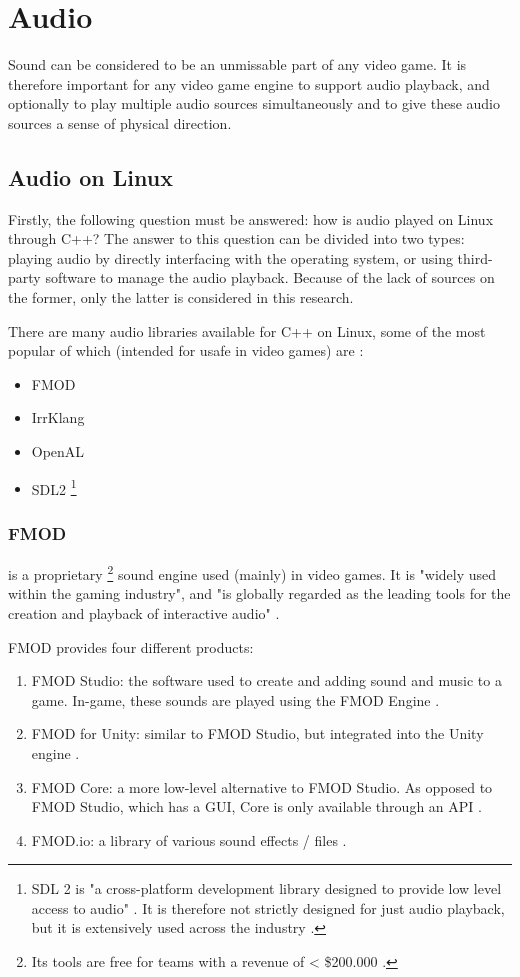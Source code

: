 \section{Audio}
Sound can be considered to be an unmissable part of any video game. It is therefore important for any video game engine to
support audio playback, and optionally to play multiple audio sources simultaneously and to give these audio sources a sense of physical direction.
\subsection{Audio on Linux}
Firstly, the following question must be answered: how is audio played on Linux through C++? The answer to this question can be divided into two types:
playing audio by directly interfacing with the operating system, or using third-party software to manage the audio playback.
Because of the lack of sources on the former, only the latter is considered in this research.

There are many audio libraries available for C++ on Linux, some of the most popular of which (intended for usafe in video games) are \cite{Szanto_2018}:
\begin{itemize}
    \item FMOD
    \item IrrKlang
    \item OpenAL
    \item SDL2 \footnote{SDL 2 is "a cross-platform development library designed to provide low level access to audio" \cite{sdl2}. It is therefore not strictly designed for just audio playback, but it is extensively used across the industry \cite{sdl2games}.}
\end{itemize}

\subsubsection{FMOD} is a proprietary \footnote{Its tools are free for teams with a revenue of < \$200.000 \cite{fmodStudio}.} sound engine used (mainly) in video games.
It is "widely used within the gaming industry", and "is globally regarded as the leading tools for the creation and playback of interactive audio" \cite{dolbyFmod}.

FMOD provides four different products:
\begin{enumerate}
    \item FMOD Studio: the software used to create and adding sound and music to a game. In-game, these sounds are played using the FMOD Engine \cite{fmodStudio}.
    \item FMOD for Unity: similar to FMOD Studio, but integrated into the Unity engine \cite{fmodUnity}.
    \item FMOD Core: a more low-level alternative to FMOD Studio. As opposed to FMOD Studio, which has a GUI, Core is only available through an API \cite{fmodCore}.
    \item FMOD.io: a library of various sound effects / files \cite{fmodIo}.
\end{enumerate}

